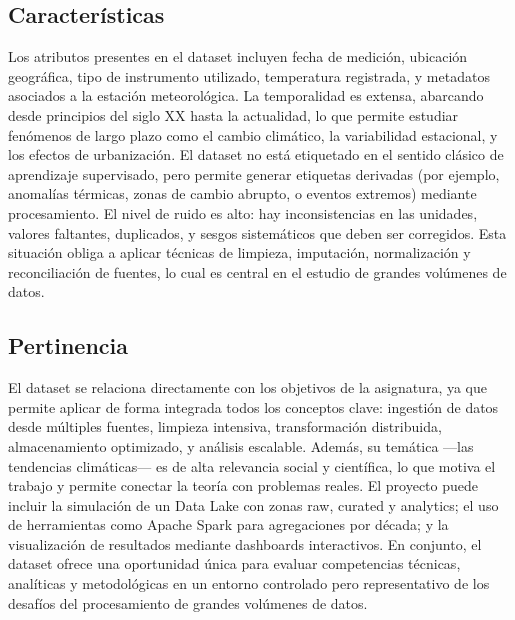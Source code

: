 \documentclass[12pt,a4paper]{scrartcl}
\begin{document}
\subsection{Características}

Los atributos presentes en el dataset incluyen fecha de medición, ubicación geográfica, tipo de instrumento utilizado, temperatura registrada, y metadatos asociados a la estación meteorológica. La temporalidad es extensa, abarcando desde principios del siglo XX hasta la actualidad, lo que permite estudiar fenómenos de largo plazo como el cambio climático, la variabilidad estacional, y los efectos de urbanización. El dataset no está etiquetado en el sentido clásico de aprendizaje supervisado, pero permite generar etiquetas derivadas (por ejemplo, anomalías térmicas, zonas de cambio abrupto, o eventos extremos) mediante procesamiento. El nivel de ruido es alto: hay inconsistencias en las unidades, valores faltantes, duplicados, y sesgos sistemáticos que deben ser corregidos. Esta situación obliga a aplicar técnicas de limpieza, imputación, normalización y reconciliación de fuentes, lo cual es central en el estudio de grandes volúmenes de datos.

\subsection{Pertinencia}

El dataset se relaciona directamente con los objetivos de la asignatura, ya que permite aplicar de forma integrada todos los conceptos clave: ingestión de datos desde múltiples fuentes, limpieza intensiva, transformación distribuida, almacenamiento optimizado, y análisis escalable. Además, su temática —las tendencias climáticas— es de alta relevancia social y científica, lo que motiva el trabajo y permite conectar la teoría con problemas reales. El proyecto puede incluir la simulación de un Data Lake con zonas raw, curated y analytics; el uso de herramientas como Apache Spark para agregaciones por década; y la visualización de resultados mediante dashboards interactivos. En conjunto, el dataset ofrece una oportunidad única para evaluar competencias técnicas, analíticas y metodológicas en un entorno controlado pero representativo de los desafíos del procesamiento de grandes volúmenes de datos.
\end{document}
